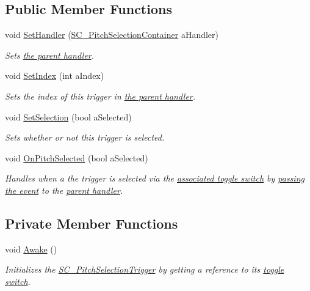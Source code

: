 \subsection*{Public Member Functions}
\begin{DoxyCompactItemize}
\item 
void \hyperlink{group___s_c___p_s_t_pub_func_ga0b334518dbdac5874adf9436cd2c7fed}{Set\+Handler} (\hyperlink{class_s_c___pitch_selection_container}{S\+C\+\_\+\+Pitch\+Selection\+Container} a\+Handler)
\begin{DoxyCompactList}\small\item\em Sets \hyperlink{group___doc_s_c___p_s_c}{the parent handler}. \end{DoxyCompactList}\item 
void \hyperlink{group___s_c___p_s_t_pub_func_ga0b4edbf9719a384aa5cf8d29d1065696}{Set\+Index} (int a\+Index)
\begin{DoxyCompactList}\small\item\em Sets the index of this trigger in \hyperlink{group___doc_s_c___p_s_c}{the parent handler}. \end{DoxyCompactList}\item 
void \hyperlink{group___s_c___p_s_t_pub_func_ga267db9aed38ba33ad44c26c84a1757df}{Set\+Selection} (bool a\+Selected)
\begin{DoxyCompactList}\small\item\em Sets whether or not this trigger is selected. \end{DoxyCompactList}\item 
void \hyperlink{group___s_c___p_s_t_handlers_ga5f4ea69eee3ed20cb09d56b7281ce861}{On\+Pitch\+Selected} (bool a\+Selected)
\begin{DoxyCompactList}\small\item\em Handles when a the trigger is selected via the \hyperlink{group___s_c___p_s_t_priv_var_ga1ecd33f50c82f6ffda81850438907a31}{associated toggle switch} by \hyperlink{group___s_c___p_s_c_handlers_gaa2afa8167100515d412cf751d9334f0c}{passing the event} to the \hyperlink{group___doc_s_c___p_s_c}{parent handler}. \end{DoxyCompactList}\end{DoxyCompactItemize}
\subsection*{Private Member Functions}
\begin{DoxyCompactItemize}
\item 
void \hyperlink{group___s_c___p_s_t_unity_gafa93dcca78e174eb2de6c4ea83b66a39}{Awake} ()
\begin{DoxyCompactList}\small\item\em Initializes the \hyperlink{class_s_c___pitch_selection_trigger}{S\+C\+\_\+\+Pitch\+Selection\+Trigger} by getting a reference to its \hyperlink{group___s_c___p_s_t_priv_var_ga1ecd33f50c82f6ffda81850438907a31}{toggle switch}. \end{DoxyCompactList}\end{DoxyCompactItemize}
